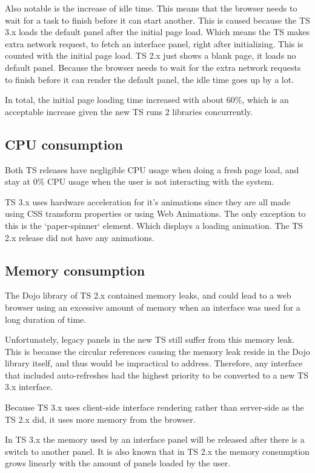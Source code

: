 \documentclass[journal,compsoc,a4paper]{IEEEtran}
\begin{document}
Also notable is the increase of idle time. This means that the browser needs to
wait for a task to finish before it can start another.
This is caused because the TS 3.x loads the default panel after the initial page
load. Which means the TS makes extra network request, to fetch an interface panel,
right after initializing. This is counted with the initial page load.
TS 2.x just shows a blank page, it loads no default panel.
Because the browser needs to wait for the extra network requests to finish before
it can render the default panel, the idle time goes up by a lot.

In total, the initial page loading time increased with about 60\%, which is an
acceptable increase given the new TS runs 2 libraries concurrently.

\subsection{CPU consumption}
Both TS releases have negligible CPU usage when doing a fresh page load, and
stay at 0\% CPU usage when the user is not interacting with the system.

TS 3.x uses hardware acceleration for it's animations since they are all made
using CSS transform properties or using Web Animations\cite{webanimations}.
The only exception to this is the `paper-spinner` element. Which displays a
loading animation.
The TS 2.x release did not have any animations.

\subsection{Memory consumption}
The Dojo library of TS 2.x contained memory leaks, and could lead to a web
browser using an excessive amount of memory when an interface was used for
a long duration of time.

Unfortunately, legacy
panels in the new TS still suffer from this memory leak. This is because the
circular references causing the memory leak reside in the Dojo library itself,
and thus would be impractical to address.
Therefore, any interface that included auto-refreshes had the highest priority
to be converted to a new TS 3.x interface.

Because TS 3.x uses client-side interface rendering rather than server-side as
the TS 2.x did, it uses more memory from the browser.

In TS 3.x the memory used
by an interface panel will be released after there is a switch to another panel.
It is also known that in TS 2.x the memory consumption grows linearly with the
amount of panels loaded by the user.
\end{document}
